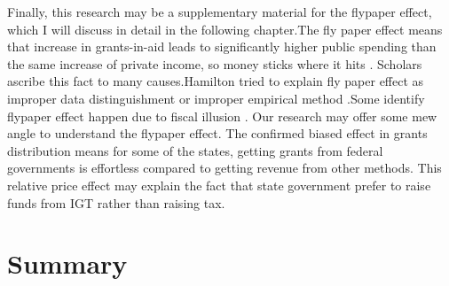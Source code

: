 Finally, this research may be a supplementary material for the flypaper effect, which I will discuss in detail in the following chapter.The fly paper effect means that increase in grants-in-aid leads to significantly higher public spending than the same increase of private income, so money sticks where it hits \cite{inman2008flypaper}. Scholars ascribe this fact to many causes.Hamilton tried to explain fly paper effect as improper data distinguishment or improper empirical method \cite{hamilton1986flypaper}.Some identify flypaper effect happen due to fiscal illusion \cite{gramlich1997stimulative}. Our research may offer some mew angle to understand the flypaper effect. The confirmed biased effect in grants distribution means for some of the states, getting grants from federal governments is effortless compared to getting revenue from other methods. This relative price effect may explain the fact that state government prefer to raise funds from IGT rather than raising tax.

\section{Summary}
